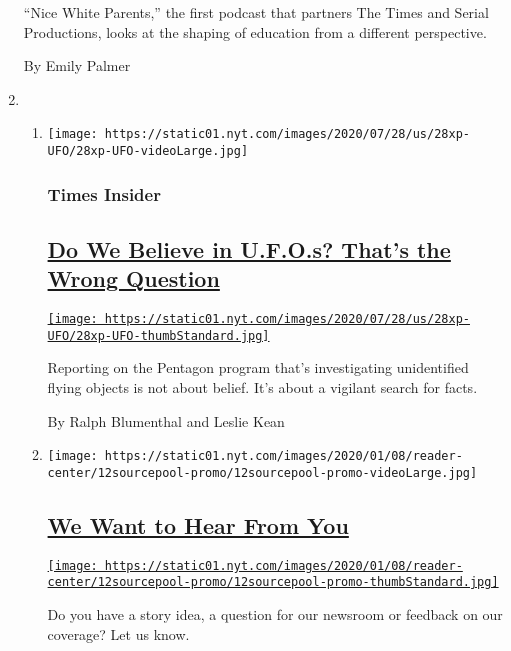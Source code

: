 \begin{enumerate}
  ``Nice White Parents,'' the first podcast that partners The Times and
  Serial Productions, looks at the shaping of education from a different
  perspective.

  By Emily Palmer
\item
  \begin{enumerate}
  \def\labelenumii{\arabic{enumii}.}
  \item
    \texttt{[image: https://static01.nyt.com/images/2020/07/28/us/28xp-UFO/28xp-UFO-videoLarge.jpg]}

    \hypertarget{times-insider-2}{%
    \subsubsection{Times Insider}\label{times-insider-2}}

    \hypertarget{do-we-believe-in-ufos-thats-the-wrong-question}{%
    \subsection{\texorpdfstring{\href{/2020/07/28/insider/UFO-reporting.html}{Do
    We Believe in U.F.O.s? That's the Wrong
    Question}}{Do We Believe in U.F.O.s? That's the Wrong Question}}\label{do-we-believe-in-ufos-thats-the-wrong-question}}

    \href{/2020/07/28/insider/UFO-reporting.html}{\texttt{[image: https://static01.nyt.com/images/2020/07/28/us/28xp-UFO/28xp-UFO-thumbStandard.jpg]}}

    Reporting on the Pentagon program that's investigating unidentified
    flying objects is not about belief. It's about a vigilant search for
    facts.

    By Ralph Blumenthal and Leslie Kean
  \item
    \texttt{[image: https://static01.nyt.com/images/2020/01/08/reader-center/12sourcepool-promo/12sourcepool-promo-videoLarge.jpg]}

    \hypertarget{we-want-to-hear-from-you}{%
    \subsection{\texorpdfstring{\href{/2019/10/15/homepage/contact-newsroom.html}{We
    Want to Hear From
    You}}{We Want to Hear From You}}\label{we-want-to-hear-from-you}}

    \href{/2019/10/15/homepage/contact-newsroom.html}{\texttt{[image: https://static01.nyt.com/images/2020/01/08/reader-center/12sourcepool-promo/12sourcepool-promo-thumbStandard.jpg]}}

    Do you have a story idea, a question for our newsroom or feedback on
    our coverage? Let us know.
  \end{enumerate}
\end{enumerate}

